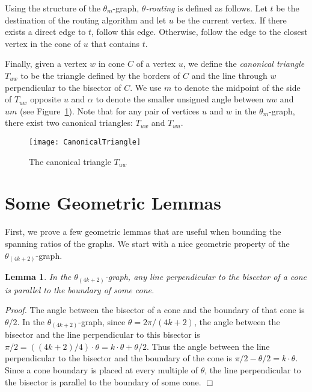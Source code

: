 \documentclass[12pt]{article}
\newtheorem{lem}[defin]{Lemma}
\newenvironment{lemma}{\begin{lem} \sl}{\end{lem}}
\newenvironment{proof}{\emph{Proof.}}{\hfill $\Box$\\}
\newcommand{\graph}[1]{\ensuremath{\theta_{(4 k + #1)}}-graph\xspace}
\newcommand{\canon}[2]{\ensuremath{T_{#1 #2}}}
\begin{document}
Using the structure of the $\theta_m$-graph, \emph{$\theta$-routing} is defined as follows. Let $t$ be the destination of the routing algorithm and let $u$ be the current vertex. If there exists a direct edge to $t$, follow this edge. Otherwise, follow the edge to the closest vertex in the cone of $u$ that contains $t$. 

Finally, given a vertex $w$ in cone $C$ of a vertex $u$, we define the \emph{canonical triangle} \canon{u}{w} to be the triangle defined by the borders of $C$ and the line through $w$ perpendicular to the bisector of $C$. We use $m$ to denote the midpoint of the side of \canon{u}{w} opposite $u$ and $\alpha$ to denote the smaller unsigned angle between $u w$ and $u m$ (see Figure~\ref{fig:CanonicalTriangle}). Note that for any pair of vertices $u$ and $w$ in the $\theta_m$-graph, there exist two canonical triangles: \canon{u}{w} and \canon{w}{u}. 

\begin{figure}[ht]
  \begin{center}
    \texttt{[image: CanonicalTriangle]}
  \end{center}
  \caption{The canonical triangle \canon{u}{w}}
  \label{fig:CanonicalTriangle}
\end{figure}


\section{Some Geometric Lemmas}
\label{sec:GeometricLemmas}
First, we prove a few geometric lemmas that are useful when bounding the spanning ratios of the graphs. We start with a nice geometric property of the \graph{2}. 

\begin{lemma}
  \label{lem:Boundary}
  In the \graph{2}, any line perpendicular to the bisector of a cone is parallel to the boundary of some cone. 
\end{lemma}
\begin{proof}
  The angle between the bisector of a cone and the boundary of that cone is $\theta/2$. In the \graph{2}, since $\theta = 2\pi / (4 k + 2)$, the angle between the bisector and the line perpendicular to this bisector is $\pi/2 = ((4 k + 2) / 4) \cdot \theta = k \cdot \theta + \theta/2$. Thus the angle between the line perpendicular to the bisector and the boundary of the cone is $\pi/2 - \theta/2 = k \cdot \theta$. Since a cone boundary is placed at every multiple of $\theta$, the line perpendicular to the bisector is parallel to the boundary of some cone. 
\end{proof}
\end{document}
